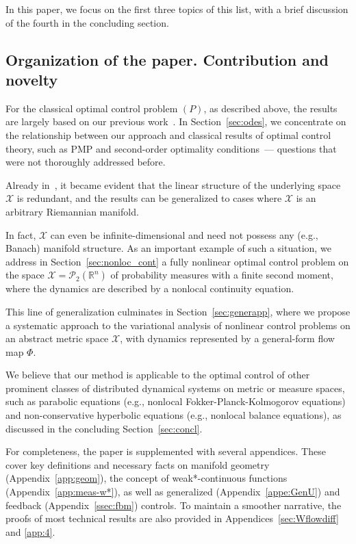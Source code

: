 \documentclass[sn-mathphys-num]{sn-jnl}
\numberwithin{equation}{section}
\theoremstyle{mythm}
\theoremstyle{mydef}
\begin{document}
\medskip

In this paper, we focus on the first three topics of this list, with a brief discussion of the fourth in the concluding section.

\subsection{Organization of the paper. Contribution and novelty}


For the classical optimal control problem \( (P) \), as described above, the results are largely based on our previous work~\cite{pogodaevExactFormulaeIncrement2024}. In Section~\ref{sec:odes}, we concentrate on the relationship between our approach and classical results of optimal control theory, such as PMP and second-order optimality conditions~--- questions that were not thoroughly addressed before. 

Already in~\cite{pogodaevExactFormulaeIncrement2024}, it became evident that the linear structure of the underlying space \( \mathcal{X} \) is redundant, and the results can be generalized to cases where \( \mathcal{X} \) is an arbitrary Riemannian manifold. 

In fact, \( \mathcal{X} \) can even be infinite-dimensional and need not possess any (e.g., Banach) manifold structure. As an important example of such a situation, we address in Section~\ref{sec:nonloc_cont} a fully nonlinear optimal control problem on the space \( \mathcal{X} = \mathcal{P}_2(\mathbb{R}^n) \) of probability measures with a finite second moment, where the dynamics are described by a nonlocal continuity equation.

This line of generalization culminates in Section~\ref{sec:generapp}, where we propose a systematic approach to the variational analysis of nonlinear control problems on an abstract metric space \( \mathcal{X} \), with dynamics represented by a general-form flow map \( \Phi \). %

We believe that our method is applicable to the optimal control of other prominent classes of distributed dynamical systems on metric or measure spaces, such as parabolic equations (e.g., nonlocal Fokker-Planck-Kolmogorov equations) and non-conservative hyperbolic equations (e.g., nonlocal balance equations), as discussed in the concluding Section~\ref{sec:concl}.

For completeness, the paper is supplemented with several appendices. These cover key definitions and necessary facts on manifold geometry (Appendix~\ref{app:geom}), the concept of weak*-continuous functions (Appendix~\ref{app:meas-w*}), as well as generalized (Appendix~\ref{appe:GenU}) and feedback (Appendix~\ref{ssec:fbm}) controls. To maintain a smoother narrative, the proofs of most technical results are also provided in Appendices~\ref{sec:Wflowdiff} and \ref{app:4}.  
\end{document}
